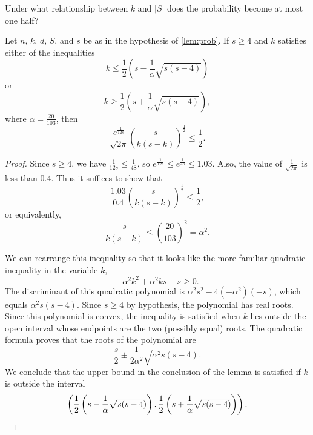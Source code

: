 \documentclass{article}
\begin{document}
Under what relationship between $k$ and $|S|$ does the probability become at most one half?

\begin{lemma}\label{lem:quad}
  Let $n$, $k$, $d$, $S$, and $s$ be as in the hypothesis of \autoref{lem:prob}.
  If $s \geq 4$ and $k$ satisfies either of the inequalities
  \begin{equation*}
    k \leq \frac{1}{2}\left(s - \frac{1}{\alpha} \sqrt{s (s - 4)}\right)
  \end{equation*}
  or
  \begin{equation*}
    k \geq \frac{1}{2}\left(s + \frac{1}{\alpha} \sqrt{s (s - 4)}\right),
  \end{equation*}
  where $\alpha = \frac{20}{103}$, then
  \begin{equation*}
    \frac{e^{\frac{1}{12s}}}{\sqrt{2 \pi}} \left(\frac{s}{k (s - k)}\right)^{\frac{1}{2}} \leq \frac{1}{2}.
  \end{equation*}
\end{lemma}
\begin{proof}
  Since $s \geq 4$, we have $\frac{1}{12 s} \leq \frac{1}{48}$, so $e^\frac{1}{12 s} \leq e^{\frac{1}{48}} \leq 1.03$.
  Also, the value of $\frac{1}{\sqrt{2 \pi}}$ is less than $0.4$.
  Thus it suffices to show that
  \begin{equation*}
    \frac{1.03}{0.4} \left(\frac{s}{k (s - k)}\right)^{\frac{1}{2}} \leq \frac{1}{2},
  \end{equation*}
  or equivalently,
  \begin{equation*}
    \frac{s}{k (s - k)} \leq \left(\frac{20}{103}\right)^2 = \alpha^2.
  \end{equation*}

  We can rearrange this inequality so that it looks like the more familiar quadratic inequality in the variable $k$,
  \begin{equation*}
    -\alpha^2 k^2 + \alpha^2 k s - s \geq 0.
  \end{equation*}
  The discriminant of this quadratic polynomial is $\alpha^2 s^2 - 4(-\alpha^2)(-s)$, which equals $\alpha^2 s (s - 4)$.
  Since $s \geq 4$ by hypothesis, the polynomial has real roots.
  Since this polynomial is convex, the inequality is satisfied when $k$ lies outside the open interval whose endpoints are the two (possibly equal) roots.
  The quadratic formula proves that the roots of the polynomial are
  \begin{equation*}
    \frac{s}{2} \pm \frac{1}{2 \alpha^2} \sqrt{\alpha^2 s (s - 4)}.
  \end{equation*}
  We conclude that the upper bound in the conclusion of the lemma is satisfied if $k$ is outside the interval
  \begin{equation*}
    \left(\frac{1}{2}\left(s - \frac{1}{\alpha} \sqrt{s (s - 4)}\right), \frac{1}{2}\left(s + \frac{1}{\alpha} \sqrt{s (s - 4)}\right)\right). \qedhere
  \end{equation*}
\end{proof}
\end{document}
